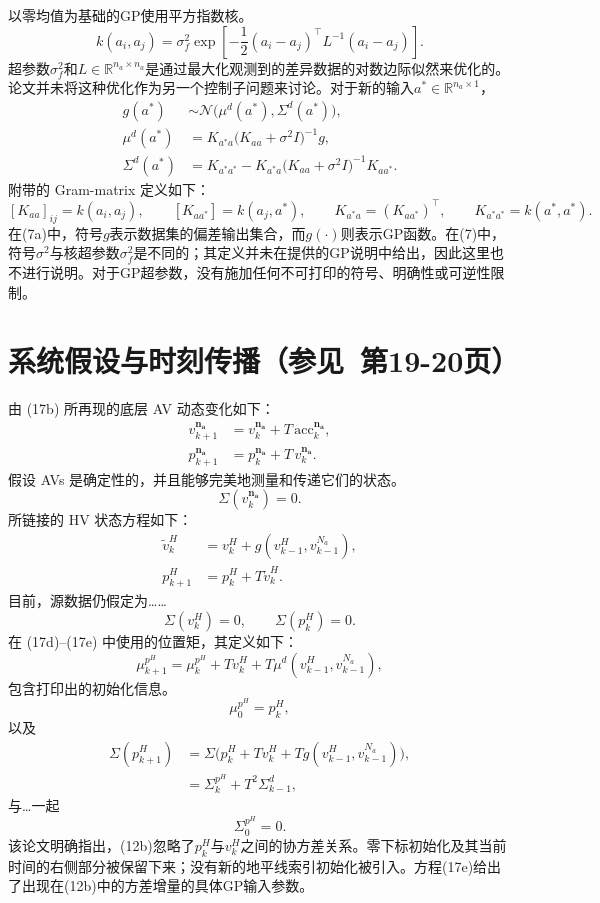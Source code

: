 \documentclass{article}
\begin{document}
以零均值为基础的GP使用平方指数核。
\begin{equation}
k(a_i,a_j)=\sigma_f^2\exp\left[-\frac12(a_i-a_j)^\top L^{-1}(a_i-a_j)\right].\tag{5}
\end{equation}
超参数$\sigma_f^2$和$L\in\mathbb R^{n_a\times n_a}$是通过最大化观测到的差异数据的对数边际似然来优化的。论文并未将这种优化作为另一个控制子问题来讨论。对于新的输入$a^*\in\mathbb R^{n_a\times1}$，
\begin{align}
g(a^*)&\sim\mathcal N\bigl(\mu^d(a^*),\Sigma^d(a^*)\bigr),\tag{6}\\
\mu^d(a^*)&=K_{a^*a}\bigl(K_{aa}+\sigma^2I\bigr)^{-1}g,\tag{7a}\\
\Sigma^d(a^*)&=K_{a^*a^*}
 -K_{a^*a}\bigl(K_{aa}+\sigma^2I\bigr)^{-1}K_{aa^*}.\tag{7b}
\end{align}
附带的 Gram-matrix 定义如下：
\[
[K_{aa}]_{ij}=k(a_i,a_j),\qquad
[K_{aa^*}]=k(a_j,a^*),\qquad
K_{a^*a}=(K_{aa^*})^\top,\qquad
K_{a^*a^*}=k(a^*,a^*).
\]
在(7a)中，符号$g$表示数据集的偏差输出集合，而$g(\cdot)$则表示GP函数。在(7)中，符号$\sigma^2$与核超参数$\sigma_f^2$是不同的；其定义并未在提供的GP说明中给出，因此这里也不进行说明。对于GP超参数，没有施加任何不可打印的符号、明确性或可逆性限制。

\section*{系统假设与时刻传播（参见\ 第19-20页）}
由 (17b) 所再现的底层 AV 动态变化如下：
\begin{align}
v_{k+1}^{\mathbf{n_a}}&=v_k^{\mathbf{n_a}}+T\,\mathrm{acc}_k^{\mathbf{n_a}},\tag{9a}\\
p_{k+1}^{\mathbf{n_a}}&=p_k^{\mathbf{n_a}}+T\,v_k^{\mathbf{n_a}}.\tag{9b}
\end{align}
假设 AVs 是确定性的，并且能够完美地测量和传递它们的状态。
\[
\Sigma(v_k^{\mathbf{n_a}})=0.
\]
所链接的 HV 状态方程如下：
\begin{align}
\widetilde v_k^H&=v_k^H+g(v_{k-1}^H,v_{k-1}^{N_a}),\tag{10a}\\
p_{k+1}^H&=p_k^H+T\widetilde v_k^H.\tag{10b}
\end{align}
目前，源数据仍假定为……
\[
\Sigma(v_k^H)=0,\qquad \Sigma(p_k^H)=0.
\]
在 (17d)–(17e) 中使用的位置矩，其定义如下：
\begin{equation}
\mu_{k+1}^{p^H}=\mu_k^{p^H}+Tv_k^H
 +T\mu^d(v_{k-1}^H,v_{k-1}^{N_a}),\tag{11}
\end{equation}
包含打印出的初始化信息。
\[
\mu_0^{p^H}=p_k^H,
\]
以及
\begin{align}
\Sigma(p_{k+1}^H)
 &=\Sigma\bigl(p_k^H+Tv_k^H+Tg(v_{k-1}^H,v_{k-1}^{N_a})\bigr),\tag{12a}\\
 &=\Sigma_k^{p^H}+T^2\Sigma_{k-1}^d,\tag{12b}
\end{align}
与…一起
\[
\Sigma_0^{p^H}=0.
\]
该论文明确指出，(12b)忽略了$p_k^H$与$v_k^H$之间的协方差关系。零下标初始化及其当前时间的右侧部分被保留下来；没有新的地平线索引初始化被引入。方程(17e)给出了出现在(12b)中的方差增量的具体GP输入参数。
\end{document}
